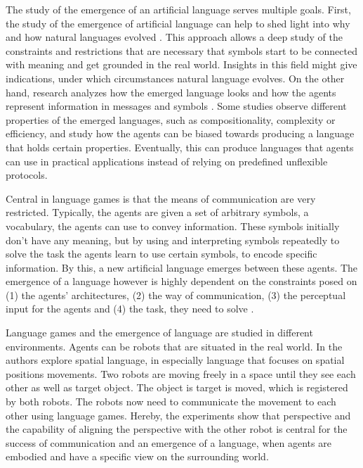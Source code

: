 The study of the emergence of an artificial language serves multiple goals.
First, the study of the emergence of artificial language can help to shed light into why and how natural languages evolved \citep{Bartlett2005,Kirby2002,Kirby2008,Noukhovitch2021}.
This approach allows a deep study of the constraints and restrictions that are necessary that symbols start to be connected with meaning and get grounded in the real world.
Insights in this field might give indications, under which circumstances natural language evolves.
On the other hand, research analyzes how the emerged language looks and how the agents represent information in messages and symbols \citep{Baroni2022,Lazaridou2017,Chaabouni2022,Kottur2017}.
Some studies observe different properties of the emerged languages, such as compositionality, complexity or efficiency, and study how the agents can be biased towards producing a language that holds certain properties.
Eventually, this can produce languages that agents can use in practical applications instead of relying on predefined unflexible protocols.

Central in language games is that the means of communication are very restricted.
Typically, the agents are given a set of arbitrary symbols, a vocabulary, the agents can use to convey information.
These symbols initially don't have any meaning, but by using and interpreting symbols repeatedly to solve the task the agents learn to use certain symbols, to encode specific information.
By this, a new artificial language emerges between these agents.
The emergence of a language however is highly dependent on the constraints posed on (1) the agents' architectures, (2) the way of communication, (3) the perceptual input for the agents and (4) the task, they need to solve \citep{Baroni2022}.

Language games and the emergence of language are studied in different environments.
Agents can be robots that are situated in the real world.
In \citep{Steels2009} the authors explore spatial language, in especially language that focuses on spatial positions movements.
Two robots are moving freely in a space until they see each other as well as target object.
The object is target is moved, which is registered by both robots.
The robots now need to communicate the movement to each other using language games.
Hereby, the experiments show that perspective and the capability of aligning the perspective with the other robot is central for the success of communication and an emergence of a language, when agents are embodied and have a specific view on the surrounding world.

